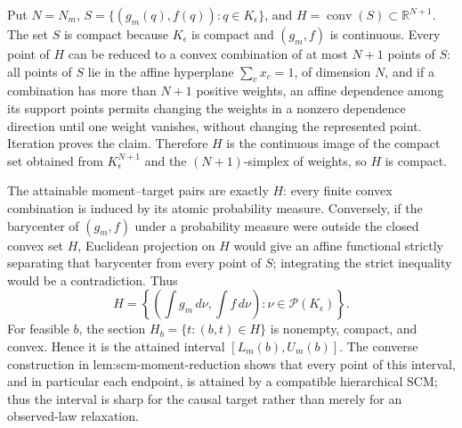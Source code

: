 Put \(N=N_m\), \(S=\{(g_m(q),f(q)):q\in K_{\epsilon}\}\), and \(H=\operatorname{conv}(S)\subset\mathbb R^{N+1}\).  The set \(S\) is compact because \(K_{\epsilon}\) is compact and \((g_m,f)\) is continuous.  Every point of \(H\) can be reduced to a convex combination of at most \(N+1\) points of \(S\): all points of \(S\) lie in the affine hyperplane \(\sum_c x_c=1\), of dimension \(N\), and if a combination has more than \(N+1\) positive weights, an affine dependence among its support points permits changing the weights in a nonzero dependence direction until one weight vanishes, without changing the represented point.  Iteration proves the claim.  Therefore \(H\) is the continuous image of the compact set obtained from \(K_{\epsilon}^{N+1}\) and the \((N+1)\)-simplex of weights, so \(H\) is compact.

The attainable moment--target pairs are exactly \(H\): every finite convex combination is induced by its atomic probability measure.  Conversely, if the barycenter of \((g_m,f)\) under a probability measure were outside the closed convex set \(H\), Euclidean projection on \(H\) would give an affine functional strictly separating that barycenter from every point of \(S\); integrating the strict inequality would be a contradiction.  Thus
\[
 H=\left\{\left(\int g_m\,d\nu,\int f\,d\nu\right):
          \nu\in\mathcal P(K_{\epsilon})\right\}.
\]
For feasible \(b\), the section \(H_b=\{t:(b,t)\in H\}\) is nonempty, compact, and convex.  Hence it is the attained interval \([L_m(b),U_m(b)]\).  The converse construction in lem:scm-moment-reduction shows that every point of this interval, and in particular each endpoint, is attained by a compatible hierarchical SCM; thus the interval is sharp for the causal target rather than merely for an observed-law relaxation.

